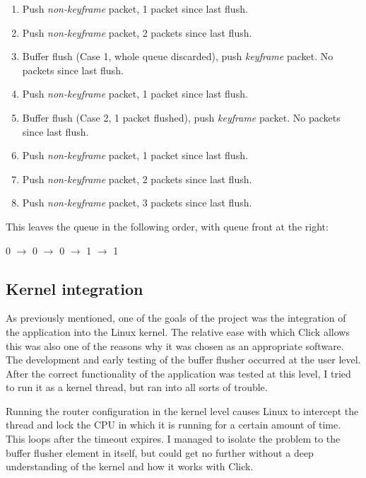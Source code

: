 \begin{enumerate}
\item{Push \textit{non-keyframe} packet, 1 packet since last flush.}
\item{Push \textit{non-keyframe} packet, 2 packets since last flush.}
\item{Buffer flush (Case 1, whole queue discarded), push \textit{keyframe} packet. No packets since last flush.}
\item{Push \textit{non-keyframe} packet, 1 packet since last flush.}
\item{Buffer flush (Case 2, 1 packet flushed), push \textit{keyframe} packet. No packets since last flush.}
\item{Push \textit{non-keyframe} packet, 1 packet since last flush.}
\item{Push \textit{non-keyframe} packet, 2 packets since last flush.}
\item{Push \textit{non-keyframe} packet, 3 packets since last flush.}
\end{enumerate}

This leaves the queue in the following order, with queue front at the right:

\begin{center}
0 $\rightarrow$ 0 $\rightarrow$ 0 $\rightarrow$ 1 $\rightarrow$ 1
\end{center}

\subsection{Kernel integration} \label{k_int}

As previously mentioned, one of the goals of the project was the integration of the application into the Linux kernel. The relative ease with which Click allows this was also one of the reasons why it was chosen as an appropriate software. The development and early testing of the buffer flusher occurred at the user level. After the correct functionality of the application was tested at this level, I tried to run it as a kernel thread, but ran into all sorts of trouble.

Running the router configuration in the kernel  level causes Linux to intercept the thread and lock the CPU in which it is running for a certain amount of time. This loops after the timeout expires. I managed to isolate the problem to the buffer flusher element in itself, but could get no further without a deep understanding of the kernel and how it works with Click.

